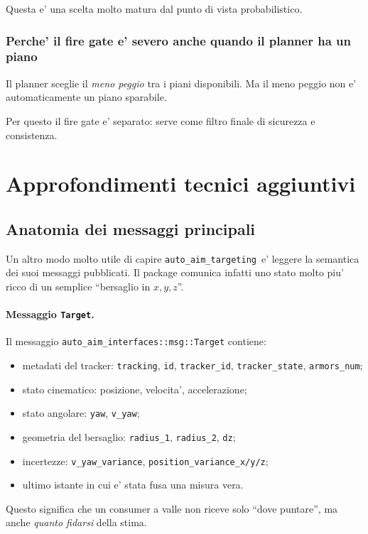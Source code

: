 \documentclass[11pt,a4paper]{article}
\newcommand{\pkg}{\texttt{auto\_aim\_targeting}}
\newcommand{\code}[1]{\texttt{#1}}
\begin{document}
Questa e' una scelta molto matura dal punto di vista probabilistico.

\subsubsection{Perche' il fire gate e' severo anche quando il planner ha un piano}

Il planner sceglie il \emph{meno peggio} tra i piani disponibili. Ma il meno peggio non e' automaticamente un piano sparabile.

Per questo il fire gate e' separato: serve come filtro finale di sicurezza e consistenza.

\section{Approfondimenti tecnici aggiuntivi}

\subsection{Anatomia dei messaggi principali}

Un altro modo molto utile di capire \pkg\ e' leggere la semantica dei suoi messaggi pubblicati. Il package comunica infatti uno stato molto piu' ricco di un semplice ``bersaglio in \(x,y,z\)''.

\paragraph{Messaggio \code{Target}.}
Il messaggio \code{auto\_aim\_interfaces::msg::Target} contiene:
\begin{itemize}[leftmargin=1.4em]
  \item metadati del tracker: \code{tracking}, \code{id}, \code{tracker\_id}, \code{tracker\_state}, \code{armors\_num};
  \item stato cinematico: posizione, velocita', accelerazione;
  \item stato angolare: \code{yaw}, \code{v\_yaw};
  \item geometria del bersaglio: \code{radius\_1}, \code{radius\_2}, \code{dz};
  \item incertezze: \code{v\_yaw\_variance}, \code{position\_variance\_x/y/z};
  \item ultimo istante in cui e' stata fusa una misura vera.
\end{itemize}

Questo significa che un consumer a valle non riceve solo ``dove puntare'', ma anche \emph{quanto fidarsi} della stima.
\end{document}
